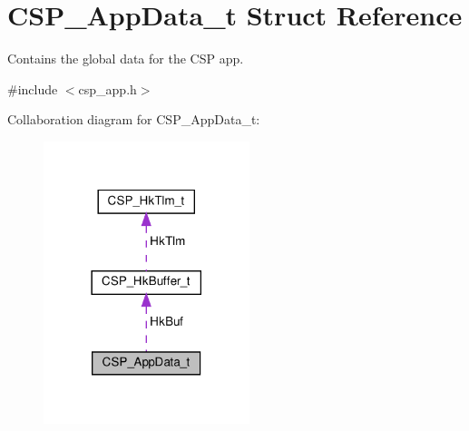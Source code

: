 \hypertarget{structCSP__AppData__t}{}\section{C\+S\+P\+\_\+\+App\+Data\+\_\+t Struct Reference}
\label{structCSP__AppData__t}


Contains the global data for the C\+SP app.  




{\ttfamily \#include $<$csp\+\_\+app.\+h$>$}



Collaboration diagram for C\+S\+P\+\_\+\+App\+Data\+\_\+t\+:
\nopagebreak
\begin{figure}[H]
\begin{center}
\leavevmode
\includegraphics[width=170pt]{structCSP__AppData__t__coll__graph}
\end{center}
\end{figure}
